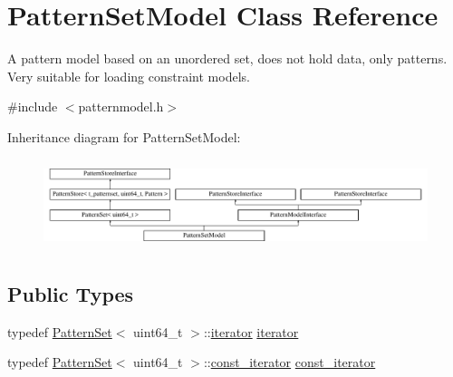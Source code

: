 \hypertarget{classPatternSetModel}{}\section{Pattern\+Set\+Model Class Reference}
\label{classPatternSetModel}


A pattern model based on an unordered set, does not hold data, only patterns. Very suitable for loading constraint models.  




{\ttfamily \#include $<$patternmodel.\+h$>$}

Inheritance diagram for Pattern\+Set\+Model\+:\begin{figure}[H]
\begin{center}
\leavevmode
\includegraphics[height=2.657177cm]{classPatternSetModel}
\end{center}
\end{figure}
\subsection*{Public Types}
\begin{DoxyCompactItemize}
\item 
typedef \hyperlink{classPatternSet}{Pattern\+Set}$<$ uint64\+\_\+t $>$\+::\hyperlink{classPatternSetModel_a59468751dd558f75f6ddaa514b93ff07}{iterator} \hyperlink{classPatternSetModel_a59468751dd558f75f6ddaa514b93ff07}{iterator}
\item 
typedef \hyperlink{classPatternSet}{Pattern\+Set}$<$ uint64\+\_\+t $>$\+::\hyperlink{classPatternSetModel_aca006659665c67916ea64d89b16a46e4}{const\+\_\+iterator} \hyperlink{classPatternSetModel_aca006659665c67916ea64d89b16a46e4}{const\+\_\+iterator}
\end{DoxyCompactItemize}
